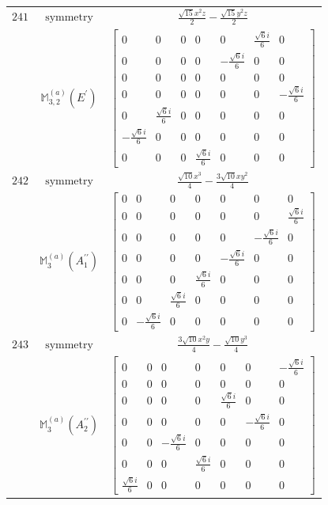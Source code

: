 \documentclass[fleqn,8pt,landscape]{jsarticle}
\begin{document}
\begin{longtable}{ccc}
$ 241 $ & $ \text{symmetry} $ & $ \frac{\sqrt{15} x^{2} z}{2} - \frac{\sqrt{15} y^{2} z}{2} $ \\
$  $ & $ \mathbb{M}_{3,2}^{(a)}(E^{\prime}) $ & $ \begin{bmatrix} 0 & 0 & 0 & 0 & 0 & \frac{\sqrt{6} i}{6} & 0 \\ 0 & 0 & 0 & 0 & - \frac{\sqrt{6} i}{6} & 0 & 0 \\ 0 & 0 & 0 & 0 & 0 & 0 & 0 \\ 0 & 0 & 0 & 0 & 0 & 0 & - \frac{\sqrt{6} i}{6} \\ 0 & \frac{\sqrt{6} i}{6} & 0 & 0 & 0 & 0 & 0 \\ - \frac{\sqrt{6} i}{6} & 0 & 0 & 0 & 0 & 0 & 0 \\ 0 & 0 & 0 & \frac{\sqrt{6} i}{6} & 0 & 0 & 0 \end{bmatrix} $ \\ \hline
$ 242 $ & $ \text{symmetry} $ & $ \frac{\sqrt{10} x^{3}}{4} - \frac{3 \sqrt{10} x y^{2}}{4} $ \\
$  $ & $ \mathbb{M}_{3}^{(a)}(A_{1}^{\prime\prime}) $ & $ \begin{bmatrix} 0 & 0 & 0 & 0 & 0 & 0 & 0 \\ 0 & 0 & 0 & 0 & 0 & 0 & \frac{\sqrt{6} i}{6} \\ 0 & 0 & 0 & 0 & 0 & - \frac{\sqrt{6} i}{6} & 0 \\ 0 & 0 & 0 & 0 & - \frac{\sqrt{6} i}{6} & 0 & 0 \\ 0 & 0 & 0 & \frac{\sqrt{6} i}{6} & 0 & 0 & 0 \\ 0 & 0 & \frac{\sqrt{6} i}{6} & 0 & 0 & 0 & 0 \\ 0 & - \frac{\sqrt{6} i}{6} & 0 & 0 & 0 & 0 & 0 \end{bmatrix} $ \\ \hline
$ 243 $ & $ \text{symmetry} $ & $ \frac{3 \sqrt{10} x^{2} y}{4} - \frac{\sqrt{10} y^{3}}{4} $ \\
$  $ & $ \mathbb{M}_{3}^{(a)}(A_{2}^{\prime\prime}) $ & $ \begin{bmatrix} 0 & 0 & 0 & 0 & 0 & 0 & - \frac{\sqrt{6} i}{6} \\ 0 & 0 & 0 & 0 & 0 & 0 & 0 \\ 0 & 0 & 0 & 0 & \frac{\sqrt{6} i}{6} & 0 & 0 \\ 0 & 0 & 0 & 0 & 0 & - \frac{\sqrt{6} i}{6} & 0 \\ 0 & 0 & - \frac{\sqrt{6} i}{6} & 0 & 0 & 0 & 0 \\ 0 & 0 & 0 & \frac{\sqrt{6} i}{6} & 0 & 0 & 0 \\ \frac{\sqrt{6} i}{6} & 0 & 0 & 0 & 0 & 0 & 0 \end{bmatrix} $ \\ \hline

\end{longtable}
\end{document}
